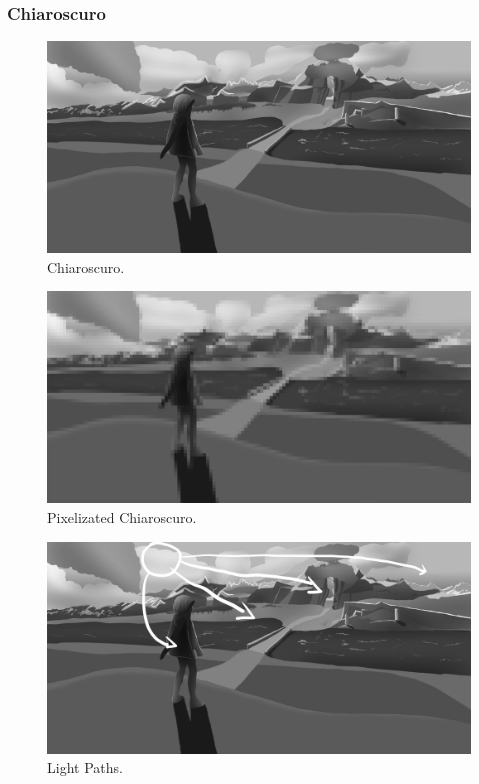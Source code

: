 \documentclass{cup-pan}
\begin{document}
        \subsubsection{Chiaroscuro}

            \begin{figure}[H]
                \includegraphics[width=\textwidth]{Imagenes/Fanart1/Analysis/claroscuro.png}
                \caption{Chiaroscuro.}
            \end{figure}

            \begin{figure}[H]
                \includegraphics[width=\textwidth]{Imagenes/Fanart1/Analysis/pixel.png}
                \caption{Pixelizated Chiaroscuro.}
            \end{figure}

            \begin{figure}[H]
                \includegraphics[width=\textwidth]{Imagenes/Fanart1/Analysis/recorridoluz.png}
                \caption{Light Paths.}
            \end{figure}
\end{document}
